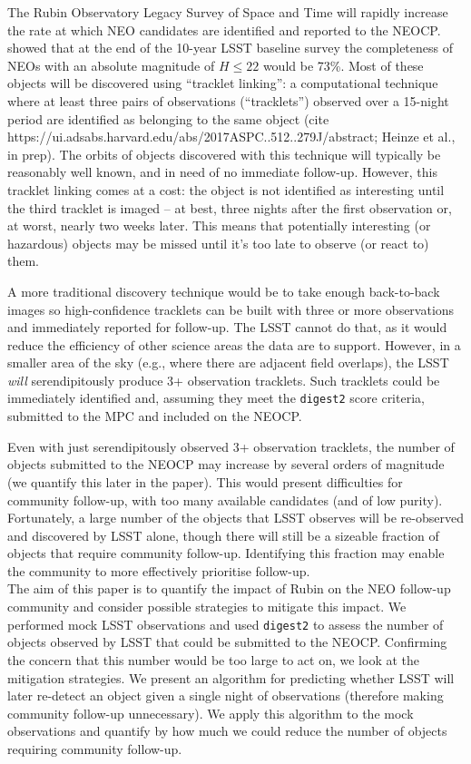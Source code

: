 \documentclass[twocolumn]{aastex631}
\newcommand{\dig}{\texttt{digest2}}
\begin{document}
The Rubin Observatory Legacy Survey of Space and Time \citep[LSST,][]{Ivezic+2019} will rapidly increase the rate at which NEO candidates are identified and reported to the NEOCP. \citet{Jones+2018} showed that at the end of the 10-year LSST baseline survey the completeness of NEOs with an absolute magnitude of $H \le 22$ would be 73\%. Most of these objects will be discovered using ``tracklet linking'': a computational technique where at least three pairs of observations (``tracklets'') observed over a 15-night period are identified as belonging to the same object (cite https://ui.adsabs.harvard.edu/abs/2017ASPC..512..279J/abstract; Heinze et al., in prep). The orbits of objects discovered with this technique will typically be reasonably well known, and in need of no immediate follow-up. However, this tracklet linking comes at a cost: the object is not identified as interesting until the third tracklet is imaged -- at best, three nights after the first observation or, at worst, nearly two weeks later. This means that potentially interesting (or hazardous) objects may be missed until it's too late to observe (or react to) them.

A more traditional discovery technique would be to take enough back-to-back images so high-confidence tracklets can be built with three or more observations and immediately reported for follow-up. The LSST cannot do that, as it would reduce the efficiency of other science areas the data are to support. However, in a smaller area of the sky (e.g., where there are adjacent field overlaps), the LSST {\em will} serendipitously produce 3+ observation tracklets. Such tracklets could be immediately identified and, assuming they meet the \dig{} score criteria, submitted to the MPC and included on the NEOCP.

Even with just serendipitously observed 3+ observation tracklets, the number of objects submitted to the NEOCP may increase by several orders of magnitude (we quantify this later in the paper). This would present difficulties for community follow-up, with too many available candidates (and of low purity). Fortunately, a large number of the objects that LSST observes will be re-observed and discovered by LSST alone, though there will still be a sizeable fraction of objects that require community follow-up. Identifying this fraction may enable the community to more effectively prioritise follow-up.
\\

The aim of this paper is to quantify the impact of Rubin on the NEO follow-up community and consider possible strategies to mitigate this impact. We performed mock LSST observations and used \dig{} to assess the number of objects observed by LSST that could be submitted to the NEOCP. Confirming the concern that this number would be too large to act on, we look at the mitigation strategies. We present an algorithm for predicting whether LSST will later re-detect an object given a single night of observations (therefore making community follow-up unnecessary). We apply this algorithm to the mock observations and quantify by how much we could reduce the number of objects requiring community follow-up.
\end{document}
